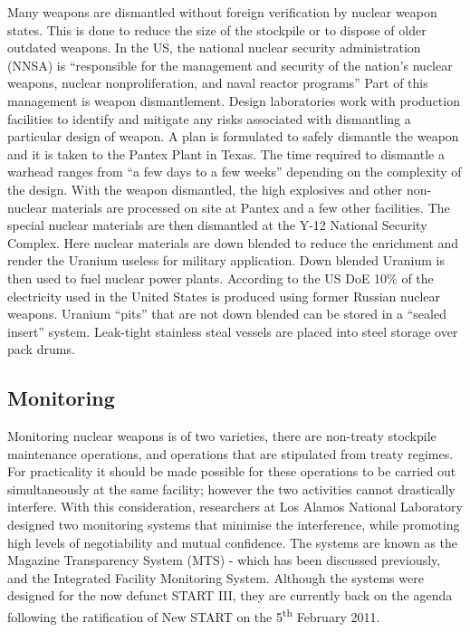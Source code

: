 \documentclass[twoside,titlepage,11pt,twocolumn,a4paper]{article}
\begin{document}
Many weapons are dismantled without foreign verification by nuclear
weapon states.  This is done to reduce the size of the stockpile or to
dispose of older outdated weapons.  In the US, the national nuclear
security administration (NNSA) is ``responsible for the management and
security of the nation's nuclear weapons, nuclear nonproliferation,
and naval reactor programs'' \citep{gerdes2001} Part of this
management is weapon dismantlement. Design laboratories work with
production facilities to identify and mitigate any risks associated
with dismantling a particular design of weapon. A plan is formulated
to safely dismantle the weapon and it is taken to the Pantex Plant in
Texas. The time required to dismantle a warhead ranges from ``a few
days to a few weeks'' depending on the complexity of the
design.\citep{ourMissionNNSA} With the weapon dismantled, the high
explosives and other non-nuclear materials are processed on site at
Pantex and a few other facilities.  The special nuclear materials are
then dismantled at the Y-12 National Security Complex.
\citep{pantex2010} Here nuclear materials are down blended to reduce
the enrichment and render the Uranium useless for military
application. Down blended Uranium is then used to fuel nuclear power
plants. According to the US DoE 10\% of the electricity used in the
United States is produced using former Russian nuclear
weapons. \citep{dismantlementNNSA} Uranium ``pits'' that are not down
blended can be stored in a ``sealed insert'' system. Leak-tight
stainless steal vessels are placed into steel storage over pack drums.

\subsection{Monitoring}
Monitoring nuclear weapons is of two varieties, there are non-treaty 
stockpile maintenance operations, and operations that are stipulated 
from treaty regimes. For practicality it should be made possible for 
these operations to be carried out simultaneously at the same facility; 
however the two activities cannot drastically interfere. With this 
consideration, researchers at Los Alamos National Laboratory designed 
two monitoring systems that minimise the interference, while promoting 
high levels of negotiability and mutual confidence. The systems are 
known as the Magazine Transparency System (MTS) - which has been 
discussed previously, and the Integrated Facility Monitoring System. 
Although the systems were designed for the now defunct START III, 
they are currently back on the agenda following the ratification of 
New START on the 5\textsuperscript{th} February 2011. 
\end{document}
